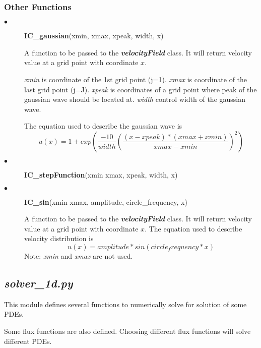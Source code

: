\documentclass[11pt]{article}
\begin{document}
        \subsubsection{Other Functions}
        \begin{description}
            \item[$\bullet$]\textbf{IC\_gaussian}(xmin, xmax, xpeak, width, x)
                \par
                A function to be passed to the \textbf{\textit{velocityField}} class. 
                It will return velocity value at a grid point with coordinate $x$.
                \par
                \textit{xmin} is coordinate of the 1st grid point (j=1).
                \textit{xmax} is coordinate of the last grid point (j=J).
                \textit{xpeak} is coordinates of a grid point where peak of the gaussian wave should be located at.
                \textit{width} control width of the gaussian wave.
                \par
                The equation used to describe the gaussian wave is 
                $$ u(x) = 1 + exp({\frac{-10}{width}(\frac{(x-xpeak)*(xmax+xmin)}{xmax-xmin})^2}) $$

            \item[$\bullet$]\textbf{IC\_stepFunction}(xmin xmax, xpeak, width, x)
                \par
            \item[$\bullet$]\textbf{IC\_sin}(xmin xmax, amplitude, circle\_frequency, x)
                \par
                A function to be passed to the \textbf{\textit{velocityField}} class. 
                It will return velocity value at a grid point with coordinate $x$.
                The equation used to describe velocity distribution is
                $$ u(x) = amplitude*sin(circle_frequency*x) $$
                Note: \textit{xmin} and \textit{xmax} are not used.

        \end{description}

    \subsection{\textbf{\textit{solver\_1d.py}}}
        This module defines several functions to numerically solve for solution of some PDEs.
        \par
        Some flux functions are also defined. Choosing different flux functions will solve different PDEs.
\end{document}

